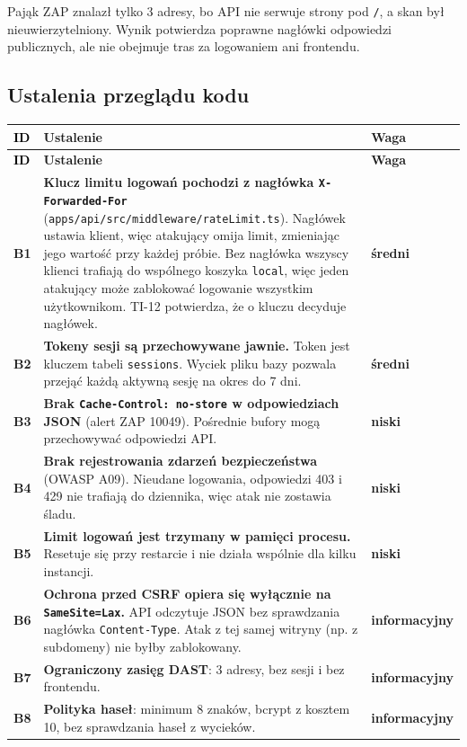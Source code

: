 \documentclass[a4paper,11pt]{article}
\newcommand{\code}[1]{\texttt{\small #1}}
\newcommand{\sev}[1]{\textsf{\small\bfseries #1}}
\newcommand{\sredni}{\textcolor{warn}{\sev{średni}}}
\newcommand{\niski}{\textcolor{accent}{\sev{niski}}}
\newcommand{\info}{\textcolor{muted}{\sev{informacyjny}}}
\begin{document}
Pająk ZAP znalazł tylko 3 adresy, bo API nie serwuje strony pod \code{/}, a skan był
nieuwierzytelniony. Wynik potwierdza poprawne nagłówki odpowiedzi publicznych, ale nie
obejmuje tras za logowaniem ani frontendu.

\subsection{Ustalenia przeglądu kodu}
\begin{xltabular}{\textwidth}{@{}>{\sffamily\bfseries\color{accent}}l L l@{}}
\toprule
\textcolor{black}{ID} & \textsf{\textbf{Ustalenie}} & \textsf{\textbf{Waga}}\\
\midrule
\endfirsthead
\toprule
\textcolor{black}{ID} & \textsf{\textbf{Ustalenie}} & \textsf{\textbf{Waga}}\\
\midrule
\endhead
\bottomrule
\endfoot
B1 & \textbf{Klucz limitu logowań pochodzi z nagłówka \code{X-Forwarded-For}}
     (\code{apps/api/src/middleware/rateLimit.ts}). Nagłówek ustawia klient, więc atakujący
     omija limit, zmieniając jego wartość przy każdej próbie. Bez nagłówka wszyscy klienci
     trafiają do wspólnego koszyka \code{local}, więc jeden atakujący może zablokować
     logowanie wszystkim użytkownikom. TI-12 potwierdza, że o kluczu decyduje nagłówek. & \sredni\\
B2 & \textbf{Tokeny sesji są przechowywane jawnie.} Token jest kluczem tabeli \code{sessions}.
     Wyciek pliku bazy pozwala przejąć każdą aktywną sesję na okres do 7 dni. & \sredni\\
B3 & \textbf{Brak \code{Cache-Control: no-store} w odpowiedziach JSON} (alert ZAP 10049).
     Pośrednie bufory mogą przechowywać odpowiedzi API. & \niski\\
B4 & \textbf{Brak rejestrowania zdarzeń bezpieczeństwa} (OWASP A09). Nieudane logowania,
     odpowiedzi 403 i 429 nie trafiają do dziennika, więc atak nie zostawia śladu. & \niski\\
B5 & \textbf{Limit logowań jest trzymany w pamięci procesu.} Resetuje się przy restarcie
     i nie działa wspólnie dla kilku instancji. & \niski\\
B6 & \textbf{Ochrona przed CSRF opiera się wyłącznie na \code{SameSite=Lax}.} API odczytuje
     JSON bez sprawdzania nagłówka \code{Content-Type}. Atak z tej samej witryny
     (np. z subdomeny) nie byłby zablokowany. & \info\\
B7 & \textbf{Ograniczony zasięg DAST}: 3 adresy, bez sesji i bez frontendu. & \info\\
B8 & \textbf{Polityka haseł}: minimum 8 znaków, bcrypt z kosztem 10, bez sprawdzania haseł
     z wycieków. & \info\\
\end{xltabular}
\end{document}

